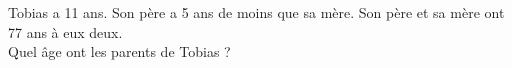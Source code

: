Tobias a 11 ans. Son père a 5 ans de moins que sa mère. Son père et sa mère ont 77 ans à eux deux.\\
Quel âge ont les parents de Tobias ?